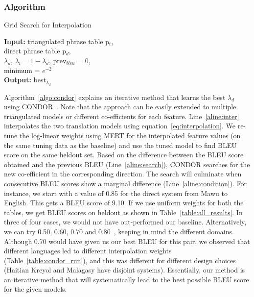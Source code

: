 \documentclass[11pt]{article}
\begin{document}
	\subsubsection{Algorithm}
	\begin{algorithm}
		\small
		\caption{Grid Search for Interpolation}
		\label{algo:condor}
		\textbf{Input:} triangulated phrase table p$_{t}$, \\ direct phrase table p$_{d}$, \\
		$\lambda_{d}$, $\lambda_{t} = 1 - \lambda_{d}$, prev$_{bleu}$ = 0, \\
		minimum = $e ^{-2}$ \\
		\textbf{Output:} best$_{\lambda_{d}}$


		\begin{algorithmic}[1]
			 \label{aline:condition}
			 \label{aline:inter}
			 \label{aline:search}
			\ENDWHILE
		\end{algorithmic}
	\end{algorithm}

	Algorithm~\ref{algo:condor} explains an iterative method that learns the best $\lambda_{d}$  using CONDOR~\cite{Condor:05}. Note that the approach can be easily extended to multiple triangulated models or different co-efficients for each feature. Line~\ref{aline:inter} interpolates the two translation models using equation~\eqref{eq:interpolation}. We re-tune the log-linear weights using MERT for the interpolated feature values (on the same tuning data as the baseline) and use the tuned model to find BLEU score on the same heldout set. Based on the difference between the BLEU score obtained and the previous BLEU (Line~\ref{aline:search}), CONDOR searches for the new co-efficient in the corresponding direction. The search will culminate when consecutive BLEU scores show a marginal difference (Line~\ref{aline:condition}). For instance, we start with a value of 0.85 for the direct system from Mawu to English. This gets a BLEU score of 9.10.  If we use uniform weights for both the tables, we get BLEU scores on heldout as shown in Table~\ref{table:all_results}. In three of four cases, we would not have out-performed our baseline. Alternatively, we can try 0.50, 0.60, 0.70 and 0.80~\cite{Nakov:12}, keeping in mind the different domains. Although 0.70 would have given us our best BLEU for this pair, we observed that different languages led to different interpolation weights (Table~\ref{table:condor_run}), and this was different for different design choices (Haitian Kreyol and Malagasy have disjoint systems). Essentially, our method is an iterative method that will systematically lead to the best possible BLEU score for the given models.  
\end{document}
